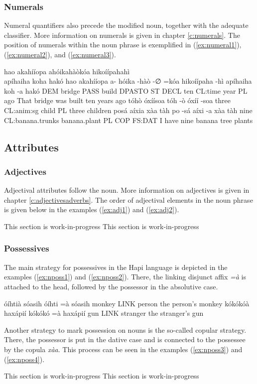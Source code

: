 \documentclass[a4paper, 12pt, oneside]{memoir}
\newcommand{\emh}[1]{\textit{#1}}
\begin{document}
\subsubsection{Numerals}
Numeral quantifiers also precede the modified noun, together with the adequate classifier. More information on numerals is given in chapter \ref{c:numerals}.  The position of numerals within the noun phrase is exemplified in (\ref{ex:numeral1}), (\ref{ex:numeral2}), and (\ref{ex:numeral3}).
\begin{examples}
\ex \label{ex:numeral1} 
\words hao akahííopa ahóikahàòkóa hikoíípahahì \\ {apíhaiha koha} hakó
\bits hao akahííopa a- hóika -hàò -∅ =kóa  hikoíípaha -hì {apíhaiha koh} -a hakó
\gloss DEM bridge PASS build DPASTO ST DECL ten CL:time year PL ago
\tr That bridge was built ten years ago
\ex \label{ex:numeral2}
\words tóhò óxíísoa
\bits tóh -ò óxíí -soa
\gloss three CL:anim:sg child PL
\tr three children
\ex \label{ex:numeral3}
\words posá aíxia xàa tàh
\bits po -sá aíxi -a xàa tàh
\gloss nine CL:banana.trunks banana.plant PL COP FS:DAT
\tr I have nine banana tree plants
\end{examples}
\subsection{Attributes}\label{sattributes}
\subsubsection{Adjectives}
Adjectival attributes follow the noun. More information on adjectives is given in chapter \ref{c:adjectivesadverbs}. The order of adjectival elements in the noun phrase is given below in the examples (\ref{ex:adj1}) and (\ref{ex:adj2}).
\begin{examples}
\ex \label{ex:adj1}
This section is work-in-progress
\ex \label{ex:adj2}
This section is work-in-progress
\end{examples}
\subsubsection{Possessives}
The main strategy for possessives in the Hapi language is depicted in the examples (\ref{ex:nposs1}) and (\ref{ex:nposs2}). There, the linking disjunct affix \emh{=à} is attached to the head, followed by the possessor in the absolutive case. 
\begin{examples}
\ex \label{ex:nposs1}
\words óíhtià sóasih
\bits óíhti =à sóasih
\gloss monkey LINK person
\tr the person's monkey
\ex \label{ex:nposs2}
\words kókókóà haxápií
\bits kókókó =à haxápií
\gloss gun LINK stranger
\tr the stranger's gun
\end{examples}
Another strategy to mark possession on nouns is the so-called copular strategy. There, the possessor is put in the dative case and is connected to the possessee by the copula \emh{xàa}. This process can be seen in the examples (\ref{ex:nposs3}) and (\ref{ex:nposs4}).
\begin{examples}
\ex \label{ex:nposs3}
This section is work-in-progress
\ex \label{ex:nposs4}
This section is work-in-progress
\end{examples}
\end{document}
